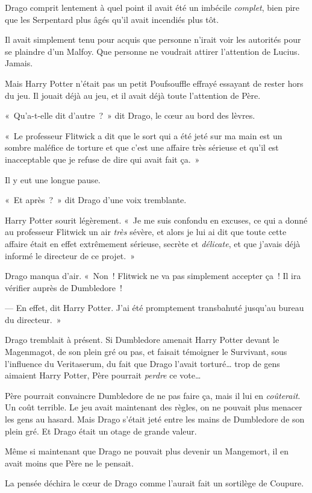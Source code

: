 Drago comprit lentement à quel point il avait été un imbécile \emph{complet}, bien pire que les Serpentard plus âgés qu'il avait incendiés plus tôt.

Il avait simplement tenu pour acquis que personne n'irait voir les autorités pour se plaindre d'un Malfoy.
Que personne ne voudrait attirer l'attention de Lucius.
Jamais.

Mais Harry Potter n'était pas un petit Poufsouffle effrayé essayant de rester hors du jeu.
Il jouait déjà au jeu, et il avait déjà toute l'attention de Père.

«~Qu'a-t-elle dit d'autre~?~»
 dit Drago, le cœur au bord des lèvres.

«~Le professeur Flitwick a dit que le sort qui a été jeté sur ma main est un sombre maléfice de torture et que c'est une affaire très sérieuse et qu'il est inacceptable que je refuse de dire qui avait fait ça.~»

Il y eut une longue pause.

«~Et après~?~»
dit Drago d'une voix tremblante.

Harry Potter sourit légèrement.
«~Je me suis confondu en excuses, ce qui a donné au professeur Flitwick un air \emph{très} sévère, et alors je lui ai dit que toute cette affaire était en effet extrêmement sérieuse, secrète et \emph{délicate}, et que j'avais déjà informé le directeur de ce projet.~»

Drago manqua d'air.
«~Non~! Flitwick ne va pas simplement accepter ça~!
Il ira vérifier auprès de Dumbledore~!

--- En effet, dit Harry Potter.
J'ai été promptement transbahuté jusqu'au bureau du directeur.~»

Drago tremblait à présent.
Si Dumbledore amenait Harry Potter devant le Magenmagot, de son plein gré ou pas, et faisait témoigner le Survivant, sous l'influence du Veritaserum, du fait que Drago l'avait torturé… trop de gens aimaient Harry Potter, Père pourrait \emph{perdre} ce vote…

Père pourrait convaincre Dumbledore de ne pas faire ça, mais il lui en \emph{coûterait}.
Un coût terrible.
Le jeu avait maintenant des règles, on ne pouvait plus menacer les gens au hasard.
Mais Drago s'était jeté entre les mains de Dumbledore de son plein gré.
Et Drago était un otage de grande valeur.

Même si maintenant que Drago ne pouvait plus devenir un Mangemort, il en avait moins que Père ne le pensait.

La pensée déchira le cœur de Drago comme l'aurait fait un sortilège de Coupure.

